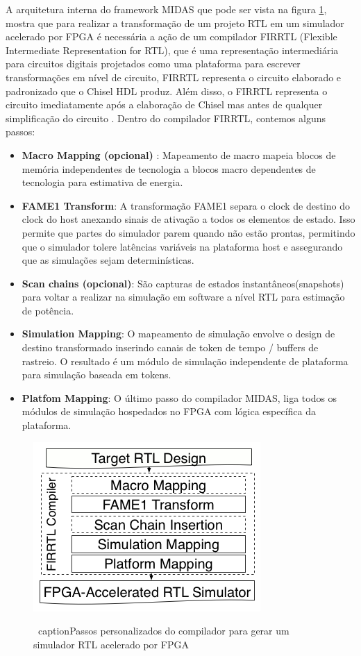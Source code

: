 \documentclass[conference]{IEEEtran}
\begin{document}
	A arquitetura interna do framework MIDAS que pode ser vista na figura \ref{Midas Arch}, mostra que para realizar a transformação de um projeto RTL em um simulador acelerado por FPGA é necessária a ação de um compilador FIRRTL (Flexible Intermediate Representation for RTL), que é uma representação intermediária para circuitos digitais projetados como uma plataforma para escrever transformações em nível de circuito, FIRRTL representa o circuito elaborado e padronizado que o Chisel HDL produz. Além disso, o FIRRTL representa o circuito imediatamente após a elaboração de Chisel mas antes de qualquer simplificação do circuito \cite{b10}. Dentro do compilador FIRRTL, contemos alguns passos:
	\begin{itemize}
		\item \textbf{Macro Mapping (opcional)} : Mapeamento de macro mapeia blocos de memória independentes de tecnologia
		a blocos macro dependentes de tecnologia para estimativa de energia.
		\item \textbf{FAME1 Transform}: A transformação FAME1 separa o clock de destino do clock do host anexando sinais de ativação a todos os elementos de estado. Isso permite que partes do simulador parem quando não estão prontas, permitindo que o simulador tolere latências variáveis na plataforma host e assegurando que as simulações sejam determinísticas.
		\item \textbf{Scan chains (opcional)}: São capturas de estados instantâneos(snapshots) para voltar a realizar na simulação em software a nível RTL para estimação de potência.  
		\item \textbf{Simulation Mapping}: O mapeamento de simulação envolve o design de destino transformado inserindo canais de token de tempo / buffers de rastreio. O resultado é um módulo de simulação independente de plataforma para simulação baseada em tokens.
		\item \textbf{Platfom Mapping}: O último passo do compilador MIDAS, liga todos os módulos de simulação hospedados no FPGA com lógica específica da plataforma.
	\end{itemize}
	
	\begin{figure}[htbp]
		\centerline{\includegraphics[scale=1.4]{fig4.png}}
		\
		caption{Passos personalizados do compilador para gerar um simulador RTL acelerado por FPGA
		}
		
		\label{Midas Arch}
	\end{figure}
	
\end{document}
